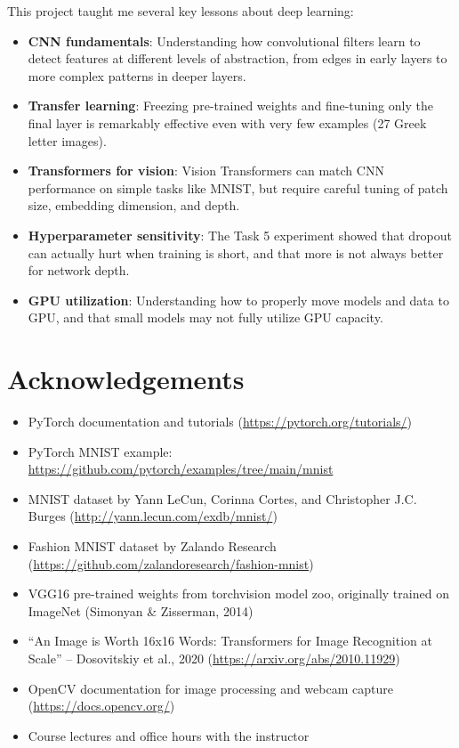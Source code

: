 \documentclass[11pt]{article}
\begin{document}
This project taught me several key lessons about deep learning:
\begin{itemize}[nosep]
    \item \textbf{CNN fundamentals}: Understanding how convolutional filters learn to detect features at different levels of abstraction, from edges in early layers to more complex patterns in deeper layers.
    \item \textbf{Transfer learning}: Freezing pre-trained weights and fine-tuning only the final layer is remarkably effective even with very few examples (27 Greek letter images).
    \item \textbf{Transformers for vision}: Vision Transformers can match CNN performance on simple tasks like MNIST, but require careful tuning of patch size, embedding dimension, and depth.
    \item \textbf{Hyperparameter sensitivity}: The Task 5 experiment showed that dropout can actually hurt when training is short, and that more is not always better for network depth.
    \item \textbf{GPU utilization}: Understanding how to properly move models and data to GPU, and that small models may not fully utilize GPU capacity.
\end{itemize}

\section{Acknowledgements}

\begin{itemize}[nosep]
    \item PyTorch documentation and tutorials (\url{https://pytorch.org/tutorials/})
    \item PyTorch MNIST example: \url{https://github.com/pytorch/examples/tree/main/mnist}
    \item MNIST dataset by Yann LeCun, Corinna Cortes, and Christopher J.C. Burges (\url{http://yann.lecun.com/exdb/mnist/})
    \item Fashion MNIST dataset by Zalando Research (\url{https://github.com/zalandoresearch/fashion-mnist})
    \item VGG16 pre-trained weights from torchvision model zoo, originally trained on ImageNet (Simonyan \& Zisserman, 2014)
    \item ``An Image is Worth 16x16 Words: Transformers for Image Recognition at Scale'' -- Dosovitskiy et al., 2020 (\url{https://arxiv.org/abs/2010.11929})
    \item OpenCV documentation for image processing and webcam capture (\url{https://docs.opencv.org/})
    \item Course lectures and office hours with the instructor
\end{itemize}
\end{document}
